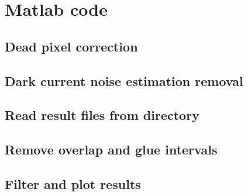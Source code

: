 \appendix %
\label{appendix:tabeller}

\clearpage

\clearpage

\section{Matlab code}

\subsection{Dead pixel correction}


\subsection{Dark current noise estimation removal}


\subsection{Read result files from directory}


\subsection{Remove overlap and glue intervals}


\subsection{Filter and plot results}
